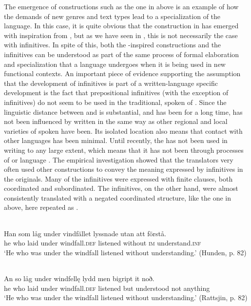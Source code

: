 \documentclass[output=paper]{langscibook}
\begin{document}
The emergence of constructions such as the one in  above is an example of how the demands of new genres and text types lead to a specialization of the language. In this case, it is quite obvious that the construction in  has emerged with inspiration from , but as we have seen in , this is not necessarily the case with  infinitives. In spite of this, both the -inspired constructions and the  infinitives can be understood as part of the same process of formal elaboration and specialization that a language undergoes when it is being used in new functional contexts. An important piece of evidence supporting the assumption that the development of  infinitives is part of a written-language specific development is the fact that prepositional  infinitives (with the exception of  infinitives) do not seem to be used in the traditional, spoken  of . Since the linguistic distance between  and  is substantial, and has been for a long time,  has not been influenced by written  in the same way as other regional and local varieties of spoken  have been. Its isolated location also means that contact with other languages has been minimal. Until recently, the  has not been used in writing to any large extent, which means that it has not been through processes of  or language . The empirical investigation showed that the  translators very often used other constructions to convey the meaning expressed by  infinitives in the  originals. Many of the  infinitives were expressed with finite clauses, both coordinated and subordinated. The  infinitives, on the other hand, were almost consistently translated with a negated coordinated structure, like the one in  above, here repeated as .


\ea
\label{ex:kalm:35}
\ea {} \\
\gll Han som låg under vindfället lyssnade utan att förstå.\\
 he who laid under windfall.\textsc{def} listened without \textsc{im} understand.\textsc{inf}\\
\glt ‘He who was under the windfall listened without understanding.’ (Hunden, p. 82)

\ex {}\\
\gll An so låg under windfellę lydd men bigript it noð.\\
he who laid under windfall.\textsc{def} listened but understood not anything\\
\glt ‘He who was under the windfall listened without understanding.’ (Rattsjin, p. 82)
\z
\z
\end{document}
